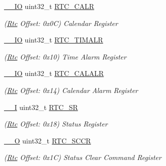 \begin{DoxyCompactItemize}
\mbox{\hyperlink{core__cm7_8h_aec43007d9998a0a0e01faede4133d6be}{\+\_\+\+\_\+\+IO}} uint32\+\_\+t \mbox{\hyperlink{structRtc_ab7a5a222639a2f970a255b4d5b79000b}{R\+T\+C\+\_\+\+C\+A\+LR}}
\begin{DoxyCompactList}\small\item\em (\mbox{\hyperlink{structRtc}{Rtc}} Offset\+: 0x0C) Calendar Register \end{DoxyCompactList}\item 
\mbox{\label{structRtc_a7599865f68c953c28af4ca0d3659918f}} 
\mbox{\hyperlink{core__cm7_8h_aec43007d9998a0a0e01faede4133d6be}{\+\_\+\+\_\+\+IO}} uint32\+\_\+t \mbox{\hyperlink{structRtc_a7599865f68c953c28af4ca0d3659918f}{R\+T\+C\+\_\+\+T\+I\+M\+A\+LR}}
\begin{DoxyCompactList}\small\item\em (\mbox{\hyperlink{structRtc}{Rtc}} Offset\+: 0x10) Time Alarm Register \end{DoxyCompactList}\item 
\mbox{\label{structRtc_adcd938b339e30ad4bb9990d8905f05ad}} 
\mbox{\hyperlink{core__cm7_8h_aec43007d9998a0a0e01faede4133d6be}{\+\_\+\+\_\+\+IO}} uint32\+\_\+t \mbox{\hyperlink{structRtc_adcd938b339e30ad4bb9990d8905f05ad}{R\+T\+C\+\_\+\+C\+A\+L\+A\+LR}}
\begin{DoxyCompactList}\small\item\em (\mbox{\hyperlink{structRtc}{Rtc}} Offset\+: 0x14) Calendar Alarm Register \end{DoxyCompactList}\item 
\mbox{\label{structRtc_a676feeb0686bca28361a14bf1b096f62}} 
\mbox{\hyperlink{core__cm7_8h_af63697ed9952cc71e1225efe205f6cd3}{\+\_\+\+\_\+I}} uint32\+\_\+t \mbox{\hyperlink{structRtc_a676feeb0686bca28361a14bf1b096f62}{R\+T\+C\+\_\+\+SR}}
\begin{DoxyCompactList}\small\item\em (\mbox{\hyperlink{structRtc}{Rtc}} Offset\+: 0x18) Status Register \end{DoxyCompactList}\item 
\mbox{\label{structRtc_a2be6272a005b1ff8830b1cd4d822c8c6}} 
\mbox{\hyperlink{core__cm7_8h_a7e25d9380f9ef903923964322e71f2f6}{\+\_\+\+\_\+O}} uint32\+\_\+t \mbox{\hyperlink{structRtc_a2be6272a005b1ff8830b1cd4d822c8c6}{R\+T\+C\+\_\+\+S\+C\+CR}}
\begin{DoxyCompactList}\small\item\em (\mbox{\hyperlink{structRtc}{Rtc}} Offset\+: 0x1C) Status Clear Command Register \end{DoxyCompactList}\item 

\end{DoxyCompactItemize}

